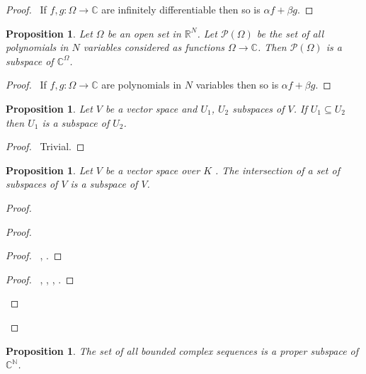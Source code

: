 \documentclass{book}
\let\qed\relax
\newtheorem{prop}[ax]{Proposition}
\theoremstyle{definition}
\begin{document}
\begin{proof}
\pf\ If $f,g : \Omega \rightarrow \mathbb{C}$ are infinitely differentiable then so is $\alpha f + \beta g$. \qed
\end{proof}

\begin{prop}
Let $\Omega$ be an open set in $\mathbb{R}^N$. Let $\mathcal{P}(\Omega)$ be the set of all polynomials in $N$ variables considered as functions $\Omega \rightarrow \mathbb{C}$. Then $\mathcal{P}(\Omega)$ is a subspace of $\mathbb{C}^\Omega$.
\end{prop}

\begin{proof}
\pf\ If $f,g : \Omega \rightarrow \mathbb{C}$ are polynomials in $N$ variables then so is $\alpha f + \beta g$. \qed
\end{proof}

\begin{prop}
Let $V$ be a vector space and $U_1$, $U_2$ subspaces of $V$. If $U_1 \subseteq U_2$ then $U_1$ is a subspace of $U_2$.
\end{prop}

\begin{proof}
\pf\ Trivial. \qed
\end{proof}

\begin{prop}
Let $V$ be a vector space over $K$ . The intersection of a set of subspaces of $V$ is a subspace of $V$.
\end{prop}

\begin{proof}
\pf
{}
\begin{proof}
	\begin{proof}
		\pf\ , .
	\end{proof}
	\begin{proof}
		\pf\ , , , .
	\end{proof}
\end{proof}
\qed
\end{proof}

\begin{prop}
The set of all bounded complex sequences is a proper subspace of $\mathbb{C}^\mathbb{N}$.
\end{prop}
\end{document}
